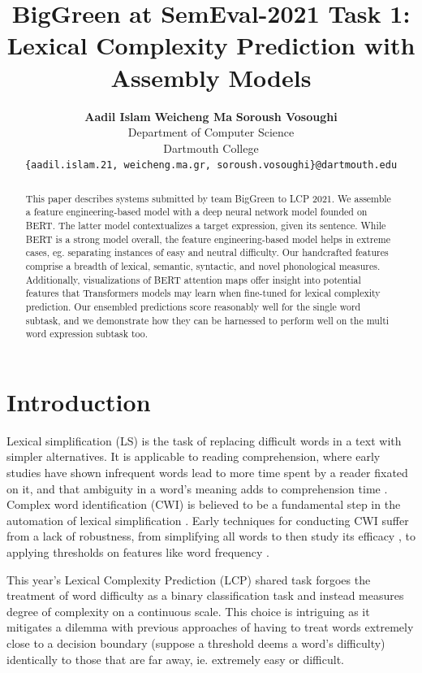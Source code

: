 \documentclass[11pt,a4paper]{article}
\title{BigGreen at SemEval-2021 Task 1: \\
Lexical Complexity Prediction with Assembly Models}
\author{
  \textbf{Aadil Islam}\normalfont{,} \textbf{Weicheng Ma}\normalfont{, and} \textbf{Soroush Vosoughi}\\
  Department of Computer Science\\
  Dartmouth College\\
  \texttt{\{aadil.islam.21, weicheng.ma.gr, soroush.vosoughi\}@dartmouth.edu}
}
\date{}
\begin{document}
\maketitle

\begin{abstract}
  This paper describes systems submitted by team BigGreen to LCP 2021. We assemble a feature engineering-based model with a deep neural network model founded on BERT. The latter model contextualizes a target expression, given its sentence. While BERT is a strong model overall, the feature engineering-based model helps in extreme cases, eg. separating instances of easy and neutral difficulty. Our handcrafted features comprise a breadth of lexical, semantic, syntactic, and novel phonological measures. Additionally, visualizations of BERT attention maps offer insight into potential features that Transformers models may learn when fine-tuned for lexical complexity prediction. Our ensembled predictions score reasonably well for the single word subtask, and we demonstrate how they can be harnessed to perform well on the multi word expression subtask too.
\end{abstract}

\section{Introduction}

Lexical simplification (LS) is the task of replacing difficult words in a text with simpler alternatives. It is applicable to reading comprehension, where early studies have shown infrequent words lead to more time spent by a reader fixated on it, and that ambiguity in a word's meaning adds to comprehension time \citep{raynerd86}. Complex word identification (CWI) is believed to be a fundamental step in the automation of lexical simplification \citep{shardlow2014open}. Early techniques for conducting CWI suffer from a lack of robustness, from simplifying all words to then study its efficacy \citep{devlintait}, to applying thresholds on features like word frequency \citep{10.1007/11573067_19}. 

This year's Lexical Complexity Prediction (LCP) shared task \citep{shardlow2020complex} forgoes the treatment of word difficulty as a binary classification task \citep{paetzoldspecia:2016:SemEval1, stajner-EtAl:2018:BEA} and instead measures degree of complexity on a continuous scale. This choice is intriguing as it mitigates a dilemma with previous approaches of having to treat words extremely close to a decision boundary (suppose a threshold deems a word's difficulty) identically to those that are far away, ie. extremely easy or difficult.
\end{document}
